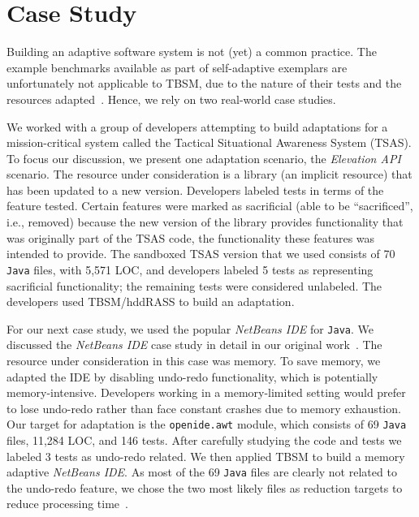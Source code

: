 \section{Case Study}
Building an adaptive software system is not (yet) a common practice. The example benchmarks available as part of self-adaptive exemplars are unfortunately not applicable to TBSM, due to the nature of their tests and the resources adapted~\cite{exemplars}. Hence, we rely on two real-world case studies.   

We worked with a group of developers attempting to build adaptations for a mission-critical system called the Tactical Situational Awareness System (TSAS). To focus our discussion, we present one adaptation scenario, the \textit{Elevation API} scenario. The resource under consideration is a library (an implicit resource) that has been updated to a new version. Developers labeled tests in terms of the feature tested. Certain features were marked as sacrificial (able to be ``sacrificed'', i.e., removed) because the new version of the library provides functionality that was originally part of the TSAS code, the functionality these features was intended to provide. The sandboxed TSAS version that we used consists of 70 \texttt{Java} files, with 5,571 LOC, and developers labeled 5 tests as representing sacrificial functionality; the remaining tests were considered unlabeled. The developers used TBSM/hddRASS to build an adaptation.

For our next case study, we used the popular \textit{NetBeans IDE} for \texttt{Java}. We discussed the \textit{NetBeans IDE} case study in detail in our original work~\cite{christi2017saso}. The resource under consideration in this case was memory. To save memory, we adapted the IDE by disabling undo-redo functionality, which is potentially memory-intensive. Developers working in a memory-limited setting would prefer to lose undo-redo rather than face constant crashes due to memory exhaustion. Our target for adaptation is the \texttt{openide.awt} module, which consists of 69 \texttt{Java} files, 11,284 LOC, and 146 tests. After carefully studying the code and tests we labeled 3 tests as undo-redo related. We then applied TBSM to build a memory adaptive \textit{NetBeans IDE}. As most of the 69 \texttt{Java} files are clearly not related to the undo-redo feature, we chose the two most likely files as reduction targets to reduce processing time~\cite{christi2017saso}. 

